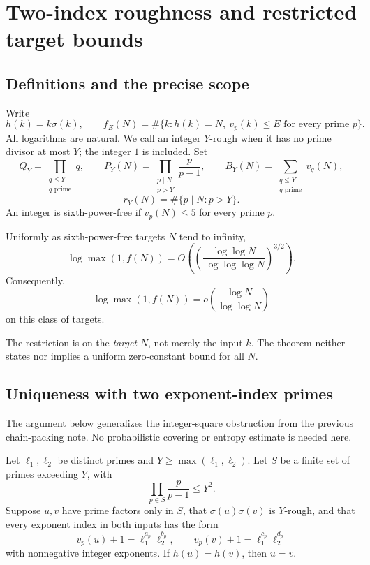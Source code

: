 \chapter{Two-index roughness and restricted target bounds}\label{ch:rough}
\section{Definitions and the precise scope}
Write
\[
 h(k)=k\sigma(k),\qquad
 f_E(N)=\#\{k:h(k)=N,\ v_p(k)\le E\text{ for every prime }p\}.
\]
All logarithms are natural. We call an integer $Y$-rough when it has no prime divisor at most $Y$; the integer $1$ is included. Set
\[
 Q_Y=\prod_{\substack{q\le Y\\q\text{ prime}}}q,\qquad
 P_Y(N)=\prod_{\substack{p\mid N\\p>Y}}\frac{p}{p-1},\qquad
 B_Y(N)=\sum_{\substack{q\le Y\\q\text{ prime}}}v_q(N),
\]
\[
 r_Y(N)=\#\{p\mid N:p>Y\}.
\]
An integer is sixth-power-free if $v_p(N)\le5$ for every prime $p$.

\begin{theorem}\label{rough:thm:main}
Uniformly as sixth-power-free targets $N$ tend to infinity,
\[
 \boxed{\log\max(1,f(N))
 =O\!\left(\left(\frac{\log\log N}{\log\log\log N}\right)^{3/2}\right).}
\]
Consequently,
\[
 \log\max(1,f(N))=o\!\left(\frac{\log N}{\log\log N}\right)
\]
on this class of targets.
\end{theorem}

The restriction is on the \emph{target} $N$, not merely the input $k$. The theorem neither states nor implies a uniform zero-constant bound for all $N$.


\section{Uniqueness with two exponent-index primes}
The argument below generalizes the integer-square obstruction from the previous chain-packing note. No probabilistic covering or entropy estimate is needed here.

\begin{lemma}\label{rough:lem:twoindex}
Let $\ell_1,\ell_2$ be distinct primes and $Y\ge\max(\ell_1,\ell_2)$. Let $S$ be a finite set of primes exceeding $Y$, with
\[
 \prod_{p\in S}\frac{p}{p-1}\le Y^2.
\]
Suppose $u,v$ have prime factors only in $S$, that $\sigma(u)\sigma(v)$ is $Y$-rough, and that every exponent index in both inputs has the form
\[
 v_p(u)+1=\ell_1^{a_p}\ell_2^{b_p},\qquad
 v_p(v)+1=\ell_1^{c_p}\ell_2^{d_p}
\]
with nonnegative integer exponents. If $h(u)=h(v)$, then $u=v$.
\end{lemma}

